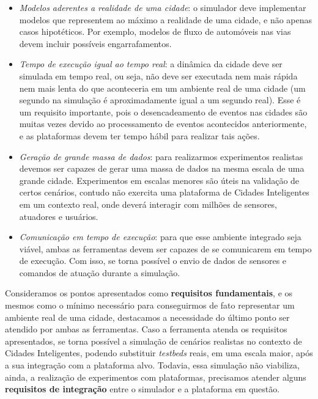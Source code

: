 \begin{itemize}
    \item \textit{Modelos aderentes a realidade de uma cidade}: o simulador deve implementar modelos que representem ao máximo a realidade de uma cidade, e não apenas casos hipotéticos.
        Por exemplo, modelos de fluxo de automóveis nas vias devem incluir possíveis engarrafamentos.

    \item \textit{Tempo de execução igual ao tempo real}: a dinâmica da cidade deve ser simulada em tempo real, ou seja, não deve ser executada nem mais rápida nem mais lenta do que aconteceria
        em um ambiente real de uma cidade (um segundo na simulação é aproximadamente igual a um segundo real).
        Esse é um requisito importante, pois o desencadeamento de eventos nas cidades são muitas vezes devido ao processamento de eventos acontecidos anteriormente, e as plataformas
        devem ter tempo hábil para realizar tais ações.

    \item \textit{Geração de grande massa de dados}: para realizarmos experimentos realistas devemos ser capazes de gerar uma massa de dados na mesma escala de uma grande cidade.
        Experimentos em escalas menores são úteis na validação de certos cenários, contudo não exercita uma plataforma de Cidades Inteligentes em um contexto real, onde deverá
        interagir com milhões de sensores, atuadores e usuários.

    \item \textit{Comunicação em tempo de execução}: para que esse ambiente integrado seja viável, ambas as ferramentas devem ser capazes de se comunicarem em tempo de execução.
        Com isso, se torna possível o envio de dados de sensores e comandos de atuação durante a simulação.
\end{itemize}

Consideramos os pontos apresentados como \textbf{requisitos fundamentais}, e os mesmos como o mínimo necessário para conseguirmos de fato representar um ambiente real de uma cidade, destacamos a necessidade
do último ponto ser atendido por ambas as ferramentas.
Caso a ferramenta atenda os requisitos apresentados, se torna possível a simulação de cenários realistas no contexto de Cidades Inteligentes, podendo substituir \textit{testbeds}
reais, em uma escala maior, após a sua integração com a plataforma alvo.
Todavia, essa simulação não viabiliza, ainda, a realização de experimentos com plataformas, precisamos atender alguns \textbf{requisitos de integração} entre o simulador
e a plataforma em questão.

